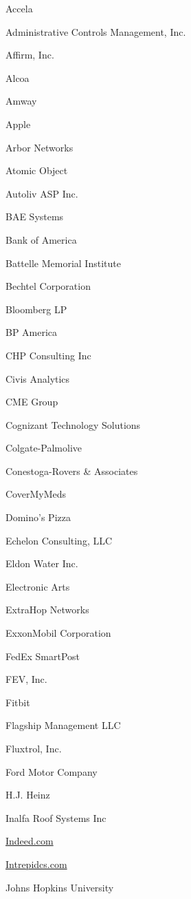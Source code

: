 \documentclass[twoside]{article}
\begin{document}
\begin{center}
\begin{multicols}{5}
        \begin{FlushLeft}
        \begin{compactitem}
        \item Accela
\item Administrative Controls Management, Inc.
\item Affirm, Inc.
\item Alcoa
\item Amway
\item Apple
\item Arbor Networks
\item Atomic Object
\item Autoliv ASP Inc.
\item BAE Systems
\item Bank of America
\item Battelle Memorial Institute
\item Bechtel Corporation
\item Bloomberg LP
\item BP America
\item CHP Consulting Inc
\item Civis Analytics
\item CME Group
\item Cognizant Technology Solutions
\item Colgate-Palmolive
\item Conestoga-Rovers \& Associates
\item CoverMyMeds
\item Domino's Pizza
\item Echelon Consulting, LLC
\item Eldon Water Inc.
\item Electronic Arts
\item ExtraHop Networks
\item ExxonMobil Corporation
\item FedEx SmartPost
\item FEV, Inc.
\item Fitbit
\item Flagship Management LLC
\item Fluxtrol, Inc.
\item Ford Motor Company
\item H.J. Heinz
\item Inalfa Roof Systems Inc
\item \url{Indeed.com}
\item \url{Intrepidcs.com}
\item Johns Hopkins University

\end{compactitem}
\end{FlushLeft}
\end{multicols}
\end{center}
\end{document}
